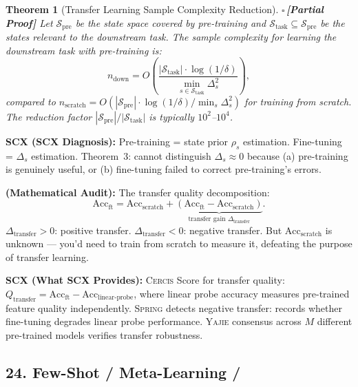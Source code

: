 \documentclass[12pt,a4paper]{article}
\newtheorem{theorem}{Theorem}[section]
\theoremstyle{definition}
\newcommand{\rigorPartial}{{\color{rigorcolor}$\square$\,\textbf{[Partial Proof]}}}
\newcommand{\Yajie}{\textsc{Yajie}}
\newcommand{\Spring}{\textsc{Spring}}
\newcommand{\Cercis}{\textsc{Cercis}}
\newcommand{\cS}{\mathcal{S}}
\newcommand{\whatMissing}{\noindent\textbf{SCX (What SCX Provides):} }
\newcommand{\diagnosis}{\noindent\textbf{SCX (SCX Diagnosis):} }
\newcommand{\mathAudit}{\noindent\textbf{ (Mathematical Audit):} }
\begin{document}
\begin{theorem}[Transfer Learning Sample Complexity Reduction]\label{thm:transfer_sample}
\rigorPartial
Let $\cS_{\text{pre}}$ be the state space covered by pre-training and $\cS_{\text{task}} \subseteq \cS_{\text{pre}}$ be the states relevant to the downstream task. The sample complexity for learning the downstream task with pre-training is:
\begin{equation}\label{eq:transfer_complexity}
    n_{\text{down}} = O\left(\frac{|\cS_{\text{task}}| \cdot \log(1/\delta)}{\min_{s \in \cS_{\text{task}}} \Delta_s^2}\right),
\end{equation}
compared to $n_{\text{scratch}} = O(|\cS_{\text{pre}}| \cdot \log(1/\delta) / \min_s \Delta_s^2)$ for training from scratch. The reduction factor $|\cS_{\text{pre}}| / |\cS_{\text{task}}|$ is typically $10^2$--$10^4$.
\end{theorem}

\diagnosis{} Pre-training = state prior $\rho_s$ estimation. Fine-tuning = $\Delta_s$ estimation. Theorem~3: cannot distinguish $\Delta_s \approx 0$ because (a) pre-training is genuinely useful, or (b) fine-tuning failed to correct pre-training's errors.

\mathAudit{} The transfer quality decomposition:
\[
\text{Acc}_{\text{ft}} = \text{Acc}_{\text{scratch}} + \underbrace{(\text{Acc}_{\text{ft}} - \text{Acc}_{\text{scratch}})}_{\text{transfer gain } \Delta_{\text{transfer}}}.
\]
$\Delta_{\text{transfer}} > 0$: positive transfer. $\Delta_{\text{transfer}} < 0$: negative transfer. But $\text{Acc}_{\text{scratch}}$ is unknown — you'd need to train from scratch to measure it, defeating the purpose of transfer learning.

\whatMissing{} \Cercis{} Score for transfer quality: $Q_{\text{transfer}} = \text{Acc}_{\text{ft}} - \text{Acc}_{\text{linear-probe}}$, where linear probe accuracy measures pre-trained feature quality independently. \Spring{} detects negative transfer: records whether fine-tuning degrades linear probe performance. \Yajie{} consensus across $M$ different pre-trained models verifies transfer robustness.

\subsection{24. Few-Shot / Meta-Learning /}
\end{document}
